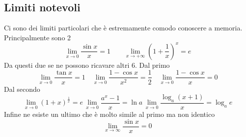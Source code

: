 \subsection{Limiti notevoli}
Ci sono dei limiti particolari che è estremamente comodo conoscere a memoria. Principalmente sono 2
\begin{equation*}
\lim\limits_{x\to0}\frac{\sin x}{x}=1\qquad\lim\limits_{x\to+\infty}\left(1+\frac{1}{x}\right)^x=e
\end{equation*}
Da questi due se ne possono ricavare altri 6. Dal primo
\begin{equation*}
\lim\limits_{x\to0}\frac{\tan x}{x}=1\quad\lim\limits_{x\to0}\frac{1-\cos x}{x^2}=\frac{1}{2}\quad
\lim\limits_{x\to0}\frac{1-\cos x}{x}=0
\end{equation*}
Dal secondo
\begin{equation*}
\lim\limits_{x\to0}(1+x)^{\frac{1}{x}}=e\,\lim\limits_{x\to0}\frac{a^x-1}{x}=\ln a\,
\lim\limits_{x\to0}\frac{\log_a(x+1)}{x}=\log_a e
\end{equation*}
Infine ne esiste un ultimo che è molto simile al primo ma non identico
\begin{equation*}
  \lim_{x \to \infty} \frac{\sin x}{x} = 0 
\end{equation*}



